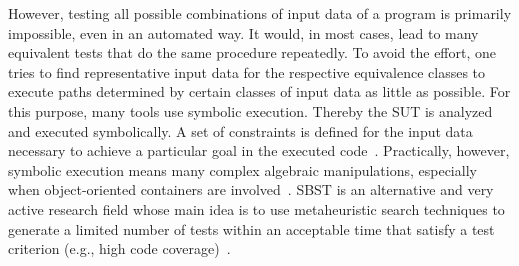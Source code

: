\documentclass{article}
\begin{document}


However, testing all possible combinations of input data of a program is primarily impossible, even in an automated way. It would, in most cases, lead to many equivalent tests that do the same procedure repeatedly. To avoid the effort, one tries to find representative input data for the respective equivalence classes to execute paths determined by certain classes of input data as little as possible. For this purpose, many tools use symbolic execution. Thereby the \ac{SUT} is analyzed and executed symbolically. A set of constraints is defined for the input data necessary to achieve a particular goal in the executed code~\cite{Clarke1976}. Practically, however, symbolic execution means many complex algebraic manipulations, especially when object-oriented containers are involved~\cite{Korel1990}. \ac{SBST} is an alternative and very active research field whose main idea is to use metaheuristic search techniques to generate a limited number of tests within an acceptable time that satisfy a test criterion (e.g., high code coverage)~\cite{McMinn_2004}. 
\end{document}
